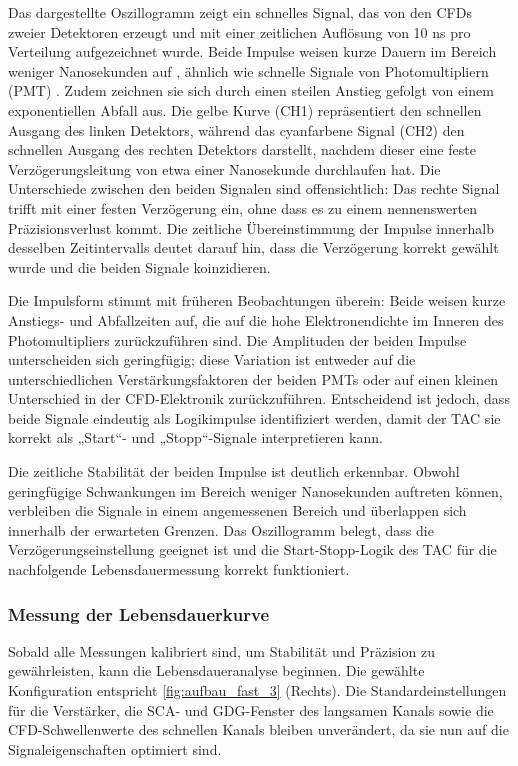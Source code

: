Das dargestellte Oszillogramm zeigt ein schnelles Signal, das von den CFDs zweier Detektoren erzeugt und mit einer zeitlichen Auflösung von 10 ns pro Verteilung aufgezeichnet wurde. Beide Impulse weisen kurze Dauern im Bereich weniger Nanosekunden auf , ähnlich wie schnelle Signale von Photomultipliern (PMT) . Zudem zeichnen sie sich durch einen steilen Anstieg gefolgt von einem exponentiellen Abfall aus. Die gelbe Kurve (CH1) repräsentiert den schnellen Ausgang des linken Detektors, während das cyanfarbene Signal (CH2) den schnellen Ausgang des rechten Detektors darstellt, nachdem dieser eine feste Verzögerungsleitung von etwa einer Nanosekunde durchlaufen hat. Die Unterschiede zwischen den beiden Signalen sind offensichtlich: Das rechte Signal trifft mit einer festen Verzögerung ein, ohne dass es zu einem nennenswerten Präzisionsverlust kommt. Die zeitliche Übereinstimmung der Impulse innerhalb desselben Zeitintervalls deutet darauf hin, dass die Verzögerung korrekt gewählt wurde und die beiden Signale koinzidieren.

Die Impulsform stimmt mit früheren Beobachtungen überein: Beide weisen kurze Anstiegs- und Abfallzeiten auf, die auf die hohe Elektronendichte im Inneren des Photomultipliers zurückzuführen sind. Die Amplituden der beiden Impulse unterscheiden sich geringfügig; diese Variation ist entweder auf die unterschiedlichen Verstärkungsfaktoren der beiden PMTs oder auf einen kleinen Unterschied in der CFD-Elektronik zurückzuführen. Entscheidend ist jedoch, dass beide Signale eindeutig als Logikimpulse identifiziert werden, damit der TAC sie korrekt als „Start“- und „Stopp“-Signale interpretieren kann.

Die zeitliche Stabilität der beiden Impulse ist deutlich erkennbar. Obwohl geringfügige Schwankungen im Bereich weniger Nanosekunden auftreten können, verbleiben die Signale in einem angemessenen Bereich und überlappen sich innerhalb der erwarteten Grenzen. Das Oszillogramm belegt, dass die Verzögerungseinstellung geeignet ist und die Start-Stopp-Logik des TAC für die nachfolgende Lebensdauermessung korrekt funktioniert.

\subsubsection{Messung der Lebensdauerkurve}
Sobald alle Messungen kalibriert sind, um Stabilität und Präzision zu gewährleisten, kann die Lebensdaueranalyse beginnen. Die gewählte Konfiguration entspricht \ref{fig:aufbau_fast_3} (Rechts). Die Standardeinstellungen für die Verstärker, die SCA- und GDG-Fenster des langsamen Kanals sowie die CFD-Schwellenwerte des schnellen Kanals bleiben unverändert, da sie nun auf die Signaleigenschaften optimiert sind.

